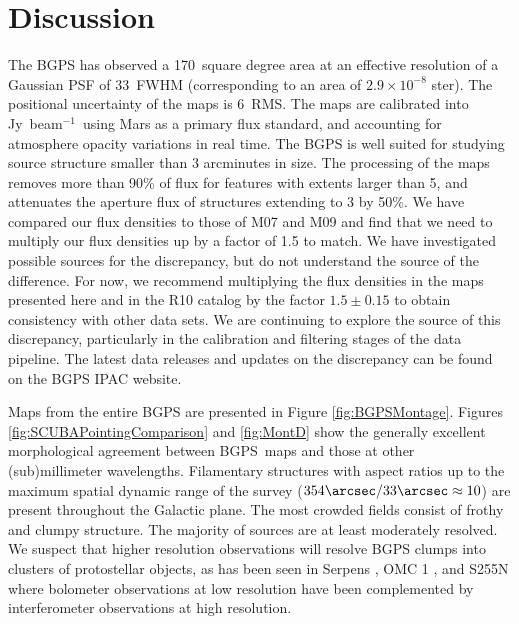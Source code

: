 \documentclass[12pt,preprint]{aastex}
\newcommand\jyb{Jy~beam$^{-1}$}
\def\bgps{BGPS}
\newcommand{\bgpsarea}{170}
\newcommand{\bcamfwhmeff}{33\arcsec}
\begin{document}
\section{Discussion}
\label{sec:Discussion}

The BGPS has observed a \bgpsarea\ square degree area at an effective
resolution of a Gaussian PSF of \bcamfwhmeff\ FWHM (corresponding to
an area of $2.9\times10^{-8}$ ster).  The positional uncertainty of
the maps is 6\arcsec\ RMS.  The maps are calibrated into \jyb\ using
Mars as a primary flux standard, and accounting for atmosphere opacity
variations in real time.  The BGPS is well suited for studying source
structure smaller than 3 arcminutes in size.  The processing of the
maps removes more than 90\% of flux for features with extents larger
than 5, and attenuates the aperture flux of structures
extending to 3 by 50\%.  We have compared our flux densities to
those of M07 and M09 and find that we need to multiply our flux
densities up by a factor of 1.5 to match. We have investigated
possible sources for the discrepancy, but do not understand the source
of the difference.  For now, we recommend multiplying the flux
densities in the maps presented here and in the R10 catalog by the
factor $1.5 \pm 0.15$ to obtain consistency with other data sets.  We
are continuing to explore the source of this discrepancy, particularly
in the calibration and filtering stages of the data pipeline.  The
latest data releases and updates on the discrepancy can be found on
the BGPS IPAC website.

Maps from the entire BGPS are presented in Figure
\ref{fig:BGPSMontage}.  Figures \ref{fig:SCUBAPointingComparison} and
\ref{fig:MontD} show the generally excellent morphological agreement
between \bgps\ maps and those at other (sub)millimeter wavelengths.
Filamentary structures with aspect ratios up to the maximum spatial
dynamic range of the survey ($354\arcsec/33\arcsec \approx 10$) are
present throughout the Galactic plane.  The most crowded fields
consist of frothy and clumpy structure.  The majority of sources are
at least moderately resolved.  We suspect that higher resolution
observations will resolve BGPS clumps into clusters of protostellar
objects, as has been seen in Serpens \citep{enoch08,Testi1998}, OMC 1
\citep{beuther04,johnstone99}, and S255N \citep{cyganowski07} where
bolometer observations at low resolution have been complemented by
interferometer observations at high resolution.
\end{document}
